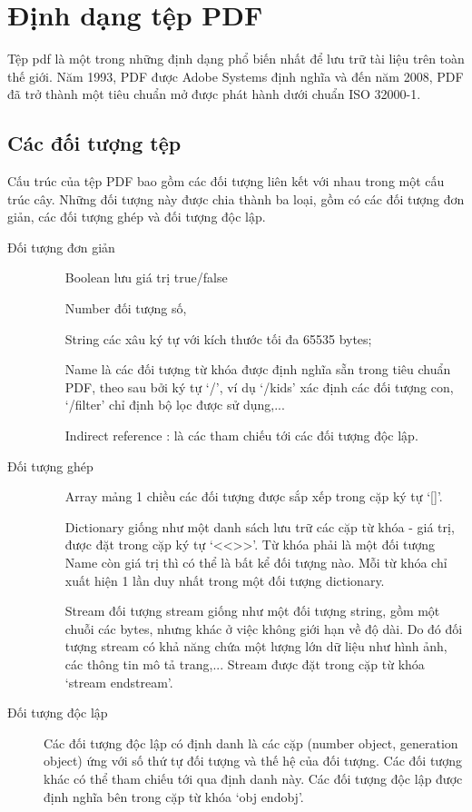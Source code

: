 \documentclass[./../main.tex]{subfiles}
\begin{document}
\section{Định dạng tệp PDF}
Tệp pdf là một trong những định dạng phổ biến nhất để lưu trữ tài liệu trên toàn thế giới. Năm 1993, PDF được Adobe Systems định nghĩa và đến năm 2008, PDF đã trở thành một tiêu chuẩn mở được phát hành dưới chuẩn ISO 32000-1.
\subsection{Các đối tượng tệp}
Cấu trúc của tệp PDF bao gồm các đối tượng liên kết với nhau trong một cấu trúc cây. Những đối tượng này được chia thành ba loại, gồm có các đối tượng đơn giản, các đối tượng ghép và đối tượng độc lập.
\begin{description}
	\item[Đối tượng đơn giản]
	      \begin{itemize}
		      \item[Boolean] lưu giá trị true/false
		      \item[Number] đối tượng số,
		      \item[String] các xâu ký tự với kích thước tối đa 65535 bytes;
		      \item[Name] là các đối tượng từ khóa được định nghĩa sẵn trong tiêu chuẩn PDF, theo sau bởi ký tự ‘/’, ví dụ ‘/kids’ xác định các đối tượng con, ‘/filter’ chỉ định bộ lọc được sử dụng,...
		      \item[Indirect reference]: là các tham chiếu tới các đối tượng độc lập.

	      \end{itemize}
	\item[Đối tượng ghép]
	      \begin{itemize}
		      \item[Array] mảng 1 chiều các đối tượng được sắp xếp trong cặp ký tự ‘[]’.
		      \item[Dictionary] giống như một danh sách lưu trữ các cặp từ khóa - giá trị, được đặt trong cặp ký tự  ‘<<>>’. Từ khóa phải là một đối tượng Name còn giá trị thì có thể là bất kể đối tượng nào. Mỗi từ khóa chỉ xuất hiện 1 lần duy nhất trong một đối tượng dictionary.
		      \item[Stream] đối tượng stream giống như một đối tượng string, gồm một chuỗi các bytes, nhưng khác ở việc không giới hạn về độ dài. Do đó đối tượng stream có khả năng chứa một lượng lớn dữ liệu như hình ảnh, các thông tin mô tả trang,... Stream được đặt trong cặp từ khóa ‘stream endstream’.
	      \end{itemize}
	\item[Đối tượng độc lập]
	      Các đối tượng độc lập có định danh là các cặp (number object, generation object) ứng với số thứ tự đối tượng và thế hệ của đối tượng. Các đối tượng khác có thể tham chiếu tới qua định danh này. Các đối tượng độc lập được định nghĩa bên trong cặp từ khóa ‘obj endobj’.

\end{description}
\end{document}
